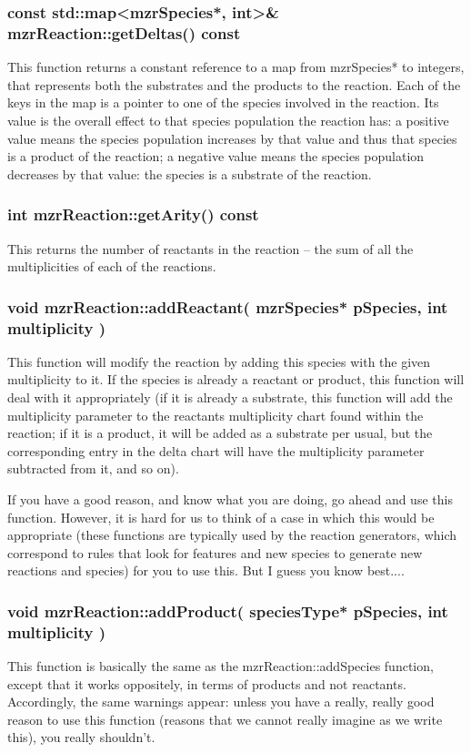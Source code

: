 \subsubsection{const std::map<mzrSpecies*, int>\&
  mzrReaction::getDeltas() const}
This function returns a constant reference to a map from mzrSpecies*
to integers, that represents both the substrates and the products to the reaction.  Each
of the keys in the map is a pointer to one of the species involved in
the reaction.  Its value is the overall effect to that species
population the reaction has: a positive value means the species
population increases by that value and thus that species is a product
of the reaction; a negative value means the species population
decreases by that value: the species is a substrate of the reaction.

\subsubsection{int mzrReaction::getArity() const}
This returns the number of reactants in the reaction -- the sum of all
the multiplicities of each of the reactions. 

\subsubsection{void mzrReaction::addReactant( mzrSpecies* pSpecies,
  int multiplicity )}

This function will modify the reaction by adding this species with the
given multiplicity to it.  If the species is already a reactant or
product, this function will deal with it appropriately (if it is
already a substrate, this function will add the multiplicity parameter
to the reactants multiplicity chart found within the reaction; if it
is a product, it will be added as a substrate per usual, but the
corresponding entry in the delta chart will have the multiplicity
parameter subtracted from it, and so on).  

If you have a good reason, and know what you are doing, go ahead and
use this function. However, it is hard for us to think of a case in
which this would be appropriate (these functions are typically used by
the reaction generators, which correspond to rules that look for
features and new species to generate new reactions and species) for
you to use this.  But I guess you know best....

\subsubsection{void mzrReaction::addProduct( speciesType* pSpecies,
  int multiplicity )}
This function is basically the same as the mzrReaction::addSpecies
function, except that it works oppositely, in terms of products and
not reactants.  Accordingly, the same warnings appear: unless you have
a really, really good reason to use this function (reasons that we
cannot really imagine as we write this), you really shouldn't.  


